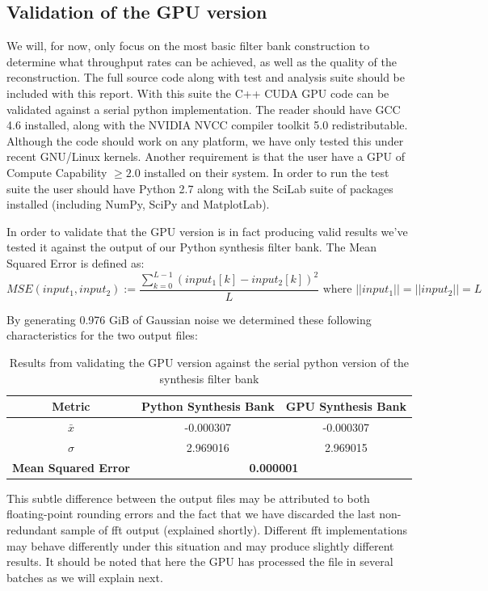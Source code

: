 \documentclass[a4paper,10pt]{article}
\begin{document}
\subsection{Validation of the GPU version}
We will, for now, only focus on the most basic filter bank construction to determine what throughput rates can be achieved, as well as the quality of the reconstruction. The full source code
along with test and analysis suite should be included with this report. With this suite the C++ CUDA GPU code can be validated against a serial python implementation. The reader 
should have GCC 4.6 installed, along with the NVIDIA NVCC compiler toolkit 5.0 redistributable. Although the code should work on any platform, we have only tested this under 
recent GNU/Linux kernels. Another requirement is that the user have a GPU of Compute Capability $\geq2.0$ installed on their system. In order to run the test suite the user should have 
Python 2.7 along with the SciLab suite of packages installed (including NumPy, SciPy and MatplotLab).

In order to validate that the GPU version is in fact producing valid results we've tested it against the output of our Python synthesis filter bank. The Mean Squared Error 
is defined as:
\begin{equation}
 MSE(input_1,input_2) := \frac{\sum_{k=0}^{L-1}{(input_1[k] - input_2[k])^2}}{L} \text{ where } ||input_1|| = ||input_2|| = L
\end{equation}

By generating 0.976 GiB of Gaussian noise we determined these following characteristics for the two output files:
\begin{table}
  \centering
  \begin{tabular}{|c|c|c|}
    \hline
    \textbf{Metric} & \textbf{Python Synthesis Bank} & \textbf{GPU Synthesis Bank} \\
    \hline
    $\bar x$ & -0.000307 & -0.000307 \\
    \hline
    $\sigma$ & 2.969016 & 2.969015 \\
    \hline
    \textbf{Mean Squared Error} & \multicolumn{2}{|c|}{\textbf{0.000001}} \\
    \hline
  \end{tabular}
  \caption[Validation of the GPU version]{Results from validating the GPU version against the serial python version of the synthesis filter bank}
\end{table}

This subtle difference between the output files may be attributed to both floating-point rounding errors and the fact that we have discarded the last non-redundant
sample of \gls{fft} output (explained shortly). Different \gls{fft} implementations may behave differently under this situation and may produce slightly different results. 
It should be noted that here the GPU has processed the file in several batches as we will explain next.
\end{document}
